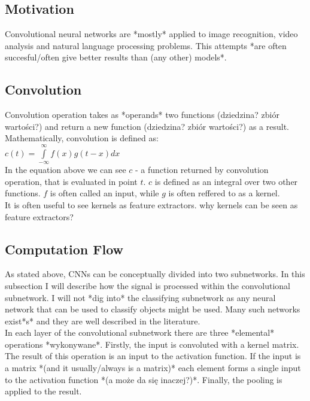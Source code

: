 \documentclass[a4paper,10pt]{report}
\begin{document}
      \subsection{Motivation} %
	Convolutional neural networks are *mostly* applied to image recognition, video analysis and natural language processing problems. %
	This attempts *are often succesful/often give better results than (any other) models*. %
	
      \subsection{Convolution} %
	Convolution operation takes as *operands* two functions (dziedzina? zbiór wartości?) and return a new function (dziedzina? zbiór wartości?) as a result. Mathematically, convolution is defined as: \\
	
	$c(t) = \int\limits_{-\infty}^\infty f(x)g(t-x)dx$ \\
	
	In the equation above we can see $c$ - a function returned by convolution operation, that is evaluated in point $t$. $c$ is defined as an integral over two other functions. $f$ is often called an input, while $g$ is often reffered to as a kernel.%
	  \\
	
	It is often useful to see kernels as feature extractors. %
	why kernels can be seen as feature extractors?
	
      \subsection{Computation Flow} %
	As stated above, CNNs can be conceptually divided into two subnetworks. In this subsection I will describe how the signal is processed within the convolutional subnetwork. I will not *dig into* the classifying subnetwork as any neural network that can be used to classify objects might be used. Many such networks exist*s* and they are well described in the literature. \\ %
	
	In each layer of the convolutional subnetwork there are three *elemental* operations *wykonywane*. Firstly, the input is convoluted with a kernel matrix. The result of this operation is an input to the activation function. If the input is a matrix *(and it usually/always is a matrix)* each element forms a single input to the activation function *(a może da się inaczej?)*. Finally, the pooling is applied to the result. \\
	
\end{document}

